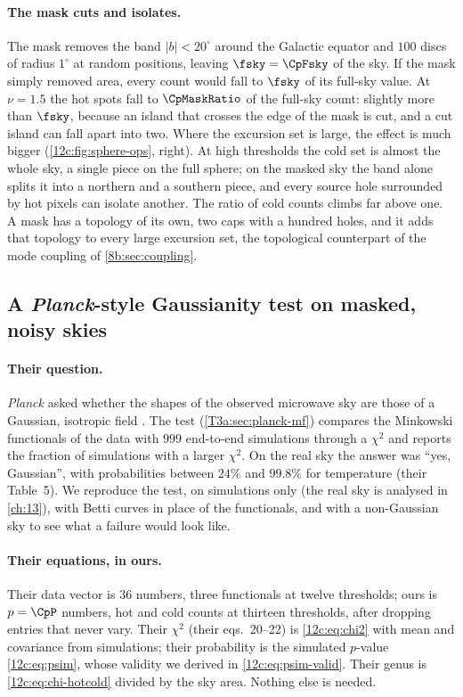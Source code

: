 \paragraph{The mask cuts and isolates.} The mask removes the band $|b|<20^\circ$ around the Galactic equator and $100$ discs of radius
$1^\circ$ at random positions, leaving $\fsky=\CpFsky$ of the sky. If the mask simply removed area, every count would fall to $\fsky$ of its
full-sky value. At $\nu=1.5$ the hot spots fall to $\CpMaskRatio$ of the full-sky count: slightly more than $\fsky$, because an island that
crosses the edge of the mask is cut, and a cut island can fall apart into two. Where the excursion set is large, the effect is much bigger
(\cref{12c:fig:sphere-ops}, right). At high thresholds the cold set is almost the whole sky, a single piece on the full sphere; on the
masked sky the band alone splits it into a northern and a southern piece, and every source hole surrounded by hot pixels can isolate
another. The ratio of cold counts climbs far above one. A mask has a topology of its own, two caps with a hundred holes, and it adds that
topology to every large excursion set, the topological counterpart of the mode coupling of \cref{8b:sec:coupling}.

\subsection{A \textit{Planck}-style Gaussianity test on masked, noisy skies}
\label{12c:sec:planck-test}

\paragraph{Their question.} \textit{Planck} asked whether the shapes of the observed microwave sky are those of a Gaussian, isotropic field
\cite{Planck2018VII}. The test (\cref{T3a:sec:planck-mf}) compares the Minkowski functionals of the data with $999$ end-to-end
simulations through a $\chi^2$ and reports the fraction of simulations with a larger $\chi^2$. On the real sky the answer was ``yes, Gaussian'',
with probabilities between $24\%$ and $99.8\%$ for temperature (their Table~5). We reproduce the test, on simulations only (the real sky is
analysed in \cref{ch:13}), with Betti curves in place of the functionals, and with a non-Gaussian sky to see what a failure would look like.

\paragraph{Their equations, in ours.} Their data vector is $36$ numbers, three functionals at twelve thresholds; ours is $p=\CpP$ numbers, hot
and cold counts at thirteen thresholds, after dropping entries that never vary. Their $\chi^2$ (their eqs.~20--22) is \eqref{12c:eq:chi2} with
mean and covariance from simulations; their probability is the simulated $p$-value \eqref{12c:eq:psim}, whose validity we derived in
\eqref{12c:eq:psim-valid}. Their genus is \eqref{12c:eq:chi-hotcold} divided by the sky area. Nothing else is needed.

